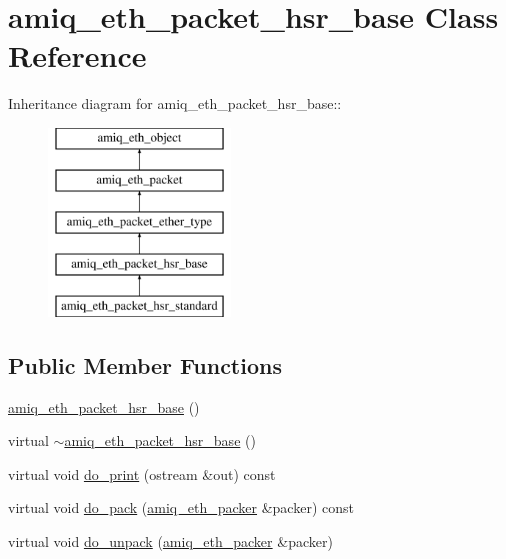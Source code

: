 \hypertarget{classamiq__eth__packet__hsr__base}{
\section{amiq\_\-eth\_\-packet\_\-hsr\_\-base Class Reference}
\label{classamiq__eth__packet__hsr__base}
}
Inheritance diagram for amiq\_\-eth\_\-packet\_\-hsr\_\-base::\begin{figure}[H]
\begin{center}
\leavevmode
\includegraphics[height=5cm]{classamiq__eth__packet__hsr__base}
\end{center}
\end{figure}
\subsection*{Public Member Functions}
\begin{DoxyCompactItemize}
\item 
\hyperlink{classamiq__eth__packet__hsr__base_a2c991d5a518f757b9243d34a5adf4854}{amiq\_\-eth\_\-packet\_\-hsr\_\-base} ()
\item 
virtual \hyperlink{classamiq__eth__packet__hsr__base_a6615f6811f3ea2c0a42cc19b44233cee}{$\sim$amiq\_\-eth\_\-packet\_\-hsr\_\-base} ()
\item 
virtual void \hyperlink{classamiq__eth__packet__hsr__base_a83b7ccb4b601e00ba5cfbbfde6658632}{do\_\-print} (ostream \&out) const 
\item 
virtual void \hyperlink{classamiq__eth__packet__hsr__base_a6dc22f94409c889f248908b1454af8b0}{do\_\-pack} (\hyperlink{classamiq__eth__packer}{amiq\_\-eth\_\-packer} \&packer) const 
\item 
virtual void \hyperlink{classamiq__eth__packet__hsr__base_ae61de71bd90f7a1c605e094845af5ccc}{do\_\-unpack} (\hyperlink{classamiq__eth__packer}{amiq\_\-eth\_\-packer} \&packer)
\end{DoxyCompactItemize}
